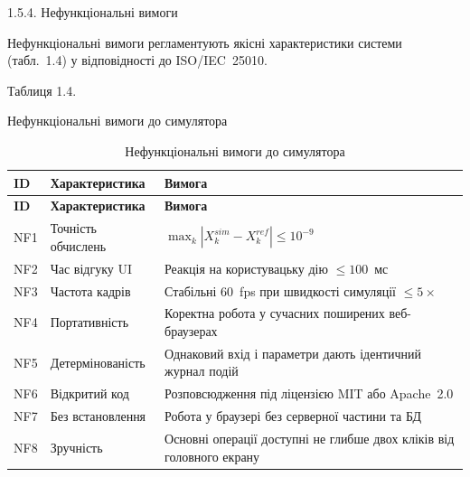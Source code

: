 1.5.4. Нефункціональні вимоги

Нефункціональні вимоги регламентують якісні характеристики системи
(табл.~1.4) у відповідності до ISO/IEC~25010.

Таблиця 1.4.

Нефункціональні вимоги до симулятора

\begin{longtable}[]{@{}
  >{\raggedright\arraybackslash}p{}
  >{\raggedright\arraybackslash}p{}
  >{\raggedright\arraybackslash}p{}@{}}
\caption[Нефункціональні вимоги до симулятора]{Нефункціональні вимоги до
симулятора}\tabularnewline
\toprule\noalign{}
\begin{minipage}[b]{\linewidth}\raggedright
\textbf{ID}
\end{minipage} & \begin{minipage}[b]{\linewidth}\raggedright
\textbf{Характеристика}
\end{minipage} & \begin{minipage}[b]{\linewidth}\raggedright
\textbf{Вимога}
\end{minipage} \\
\midrule\noalign{}
\endfirsthead
\toprule\noalign{}
\begin{minipage}[b]{\linewidth}\raggedright
\textbf{ID}
\end{minipage} & \begin{minipage}[b]{\linewidth}\raggedright
\textbf{Характеристика}
\end{minipage} & \begin{minipage}[b]{\linewidth}\raggedright
\textbf{Вимога}
\end{minipage} \\
\midrule\noalign{}
\endhead
\bottomrule\noalign{}
\endlastfoot
NF1 & Точність обчислень &
\(\max_{k}|X_{k}^{sim} - X_{k}^{ref}| \leq 10^{- 9}\) \\
NF2 & Час відгуку UI & Реакція на користувацьку дію \(\leq 100\)~мс \\
NF3 & Частота кадрів & Стабільні 60~fps при швидкості симуляції
\(\leq 5 \times\) \\
NF4 & Портативність & Коректна робота у сучасних поширених
веб-браузерах \\
NF5 & Детермінованість & Однаковий вхід і параметри дають ідентичний
журнал подій \\
NF6 & Відкритий код & Розповсюдження під ліцензією MIT або Apache~2.0 \\
NF7 & Без встановлення & Робота у браузері без серверної частини та
БД \\
NF8 & Зручність & Основні операції доступні не глибше двох кліків від
головного екрану \\
\end{longtable}


